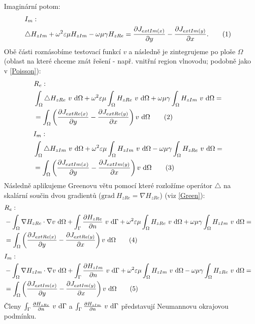 \documentclass[12pt,a4paper,oneside]{article}
\numberwithin{equation}{section} %
\numberwithin{figure}{section} %
\numberwithin{table}{section} %
\newcommand{\grad}{\mathrm{grad}\ }
\newcommand\numberthis{\addtocounter{equation}{1}\tag{\theequation}}
\begin{document}
Imaginární potom:
\begin{align*}
&I_{m}:
\\
&\triangle H _{zIm} + \omega ^2 \varepsilon \mu H _{zIm} - \omega \mu \gamma H _{zRe} = \frac{\partial J _{extIm(x)}}{\partial y} - \frac{\partial J _{extIm(y)}}{\partial x} .
\numberthis
\end{align*}
Obě části roznásobíme testovací funkcí $v$ a následně je  zintegrujeme po ploše $\Omega$ (oblast na které chceme znát řešení - např. vnitřní region vlnovodu; podobně jako v \ref{Poisson}):
\begin{align*}
&R_e:
\\
&\int _{\Omega} \triangle H _{zRe} ~ v ~ \ud \Omega + \omega ^2 \varepsilon \mu \int _{\Omega} H _{zRe} ~ v ~ \ud \Omega + \omega \mu \gamma \int _{\Omega} H _{zIm} ~ v ~ \ud \Omega = 
\\
&= \int _{\Omega} \left( \frac{\partial J _{extRe(x)}}{\partial y} - \frac{\partial J _{extRe(y)}}{\partial x} \right) v ~ \ud \Omega
\numberthis
\end{align*}
\begin{align*}
&I_m:
\\
&\int _{\Omega} \triangle H _{zIm} ~ v ~ \ud \Omega + \omega ^2 \varepsilon \mu \int _{\Omega} H _{zIm} ~ v ~ \ud \Omega - \omega \mu \gamma \int _{\Omega} H _{zRe} ~ v ~ \ud \Omega = 
\\
&= \int _{\Omega} \left(\frac{\partial J _{extIm(x)}}{\partial y} - \frac{\partial J _{extIm(y)}}{\partial x} \right) v ~ \ud \Omega
\numberthis
\end{align*}
Následně aplikujeme Greenovu větu pomocí které rozložíme operátor $\triangle$ na skalární součin dvou gradientů ($\grad H _{zRe} = \nabla H _{zRe}$) (viz \ref{Green}):
\begin{align*}
&R_e:
\\
&- \int _{\Omega} \nabla H _{zRe} \cdot \nabla v ~ \ud \Omega + \int _{\Gamma} \frac{\partial H _{zRe}}{\partial n} ~ v ~ \ud \Gamma + \omega ^2 \varepsilon \mu \int _{\Omega} H _{zRe} ~ v ~ \ud \Omega + \omega \mu \gamma \int _{\Omega} H _{zIm} ~ v ~ \ud \Omega =
\\
&= \int _{\Omega} \left( \frac{\partial J _{extRe(x)}}{\partial y} - \frac{\partial J _{extRe(y)}}{\partial x} \right) v ~ \ud \Omega
\numberthis
\end{align*}
\begin{align*}
&I_m:
\\
&- \int _{\Omega} \nabla H _{zIm} \cdot \nabla v ~ \ud \Omega + \int _{\Gamma} \frac{\partial H _{zIm}}{\partial n} ~ v ~ \ud \Gamma + \omega ^2 \varepsilon \mu \int _{\Omega} H _{zIm} ~ v ~ \ud \Omega - \omega \mu \gamma \int _{\Omega} H _{zRe} ~ v ~ \ud \Omega = 
\\
&= \int _{\Omega} \left( \frac{\partial J _{extIm(x)}}{\partial y} - \frac{\partial J _{extIm(y)}}{\partial x} \right) v ~ \ud \Omega
\numberthis
\end{align*}
Členy $\int _{\Gamma} \frac{\partial H _{zRe}}{\partial n} ~ v ~ \mathrm{d} \Gamma$ a $\int _{\Gamma} \frac{\partial H _{zIm}}{\partial n} ~ v ~ \mathrm{d} \Gamma$ představují Neumannovu okrajovou podmínku.
\end{document}
